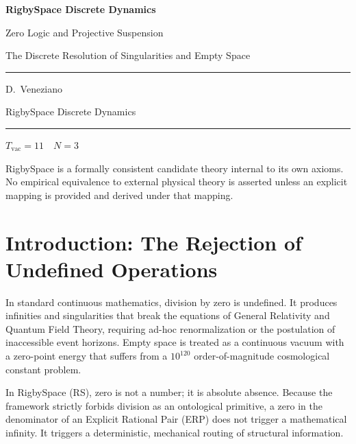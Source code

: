 \documentclass[11pt, letterpaper]{article}
\newcommand{\Tvac}{T_{\mathrm{vac}}}
\begin{document}
\begin{titlepage}
  \centering
  \vspace*{2cm}
  {\Huge\bfseries\color{RSblue} RigbySpace Discrete Dynamics\par}
  \vspace{0.5cm}
  {\LARGE Zero Logic and Projective Suspension\par}
  \vspace{0.5cm}
  {\large The Discrete Resolution of Singularities and Empty Space\par}
  \vspace{2cm}
  \rule{0.6\textwidth}{0.4pt}\par
  \vspace{1cm}
  {\large D.\ Veneziano\par}
  \vspace{0.8cm}
  {\normalsize RigbySpace Discrete Dynamics\par}
  \vspace{1.5cm}
  \rule{0.6\textwidth}{0.4pt}\par
  \vspace{0.5cm}
  {\small $\Tvac = 11 \quad N = 3$ \par}
  \vfill
  {\small\color{RSgray}
  RigbySpace is a formally consistent candidate theory internal to its own
  axioms. No empirical equivalence to external physical theory is asserted
  unless an explicit mapping is provided and derived under that mapping.\par}
\end{titlepage}

\tableofcontents
\newpage

\section{Introduction: The Rejection of Undefined Operations}

In standard continuous mathematics, division by zero is undefined. It produces infinities and singularities that break the equations of General Relativity and Quantum Field Theory, requiring ad-hoc renormalization or the postulation of inaccessible event horizons. Empty space is treated as a continuous vacuum with a zero-point energy that suffers from a $10^{120}$ order-of-magnitude cosmological constant problem.

In RigbySpace (RS), zero is not a number; it is absolute absence. Because the framework strictly forbids division as an ontological primitive, a zero in the denominator of an Explicit Rational Pair (ERP) does not trigger a mathematical infinity. It triggers a deterministic, mechanical routing of structural information.
\end{document}
